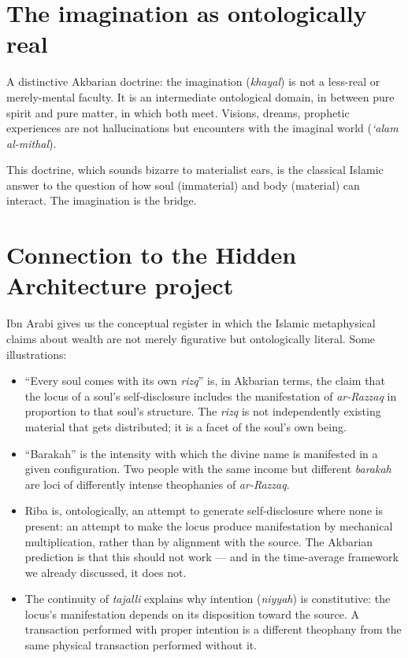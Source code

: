 \documentclass[11pt,a4paper]{book}
\theoremstyle{cleanrm}
\begin{document}
\section{The imagination as ontologically real}

A distinctive Akbarian doctrine: the imagination (\emph{khayal}) is
not a less-real or merely-mental faculty. It is an intermediate
ontological domain, in between pure spirit and pure matter, in which
both meet. Visions, dreams, prophetic experiences are not
hallucinations but encounters with the imaginal world (\emph{`alam
al-mithal}).

This doctrine, which sounds bizarre to materialist ears, is the
classical Islamic answer to the question of how soul (immaterial) and
body (material) can interact. The imagination is the bridge.

\section{Connection to the Hidden Architecture project}

Ibn Arabi gives us the conceptual register in which the Islamic
metaphysical claims about wealth are not merely figurative but
ontologically literal. Some illustrations:

\begin{itemize}[leftmargin=2em]
    \item ``Every soul comes with its own \emph{rizq}'' is, in
    Akbarian terms, the claim that the locus of a soul's
    self-disclosure includes the manifestation of \emph{ar-Razzaq}
    in proportion to that soul's structure. The \emph{rizq} is not
    independently existing material that gets distributed; it is a
    facet of the soul's own being.
    \item ``Barakah'' is the intensity with which the divine name is
    manifested in a given configuration. Two people with the same
    income but different \emph{barakah} are loci of differently
    intense theophanies of \emph{ar-Razzaq}.
    \item Riba is, ontologically, an attempt to generate
    self-disclosure where none is present: an attempt to make the
    locus produce manifestation by mechanical multiplication, rather
    than by alignment with the source. The Akbarian prediction is
    that this should not work --- and in the time-average framework
    we already discussed, it does not.
    \item The continuity of \emph{tajalli} explains why intention
    (\emph{niyyah}) is constitutive: the locus's manifestation
    depends on its disposition toward the source. A transaction
    performed with proper intention is a different theophany from
    the same physical transaction performed without it.
\end{itemize}
\end{document}
